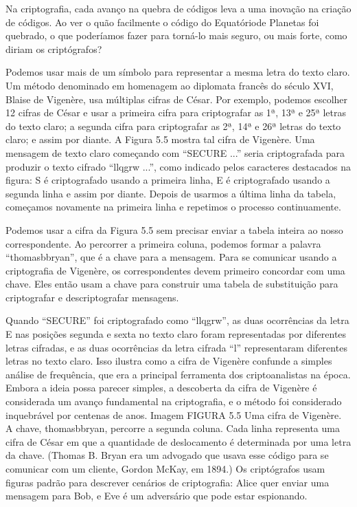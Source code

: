 \documentclass{book}
\begin{document}
Na criptografia, cada avanço na quebra de códigos leva a uma inovação na criação de códigos. Ao ver o quão facilmente o código do Equatóriode Planetas foi quebrado, o que poderíamos fazer para torná-lo mais seguro, ou mais forte, como diriam os criptógrafos?

Podemos usar mais de um símbolo para representar a mesma letra do texto claro. Um método denominado em homenagem ao diplomata francês do século XVI, Blaise de Vigenère, usa múltiplas cifras de César. Por exemplo, podemos escolher 12 cifras de César e usar a primeira cifra para criptografar as 1ª, 13ª e 25ª letras do texto claro; a segunda cifra para criptografar as 2ª, 14ª e 26ª letras do texto claro; e assim por diante. A Figura 5.5 mostra tal cifra de Vigenère. Uma mensagem de texto claro começando com ``SECURE ...'' seria criptografada para produzir o texto cifrado ``llqgrw ...'', como indicado pelos caracteres destacados na figura: S é criptografado usando a primeira linha, E é criptografado usando a segunda linha e assim por diante. Depois de usarmos a última linha da tabela, começamos novamente na primeira linha e repetimos o processo continuamente.

Podemos usar a cifra da Figura 5.5 sem precisar enviar a tabela inteira ao nosso correspondente. Ao percorrer a primeira coluna, podemos formar a palavra ``thomasbbryan'', que é a chave para a mensagem. Para se comunicar usando a criptografia de Vigenère, os correspondentes devem primeiro concordar com uma chave. Eles então usam a chave para construir uma tabela de substituição para criptografar e descriptografar mensagens.

Quando ``SECURE'' foi criptografado como ``llqgrw'', as duas ocorrências da letra E nas posições segunda e sexta no texto claro foram representadas por diferentes letras cifradas, e as duas ocorrências da letra cifrada ``l'' representaram diferentes letras no texto claro. Isso ilustra como a cifra de Vigenère confunde a simples análise de frequência, que era a principal ferramenta dos criptoanalistas na época. Embora a ideia possa parecer simples, a descoberta da cifra de Vigenère é considerada um avanço fundamental na criptografia, e o método foi considerado inquebrável por centenas de anos.
Imagem
FIGURA 5.5 Uma cifra de Vigenère. A chave, thomasbbryan, percorre a segunda coluna. Cada linha representa uma cifra de César em que a quantidade de deslocamento é determinada por uma letra da chave. (Thomas B. Bryan era um advogado que usava esse código para se comunicar com um cliente, Gordon McKay, em 1894.)
Os criptógrafos usam figuras padrão para descrever cenários de criptografia: Alice quer enviar uma mensagem para Bob, e Eve é um adversário que pode estar espionando.
\end{document}
